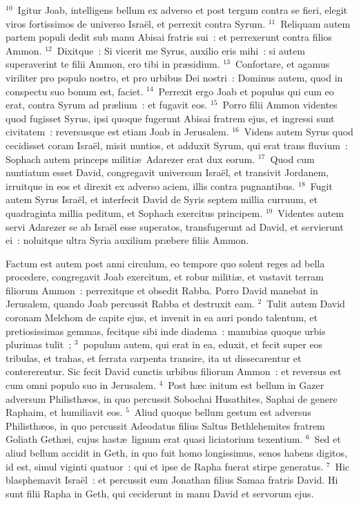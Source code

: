 ${}^{10}$~Igitur Joab, intelligens bellum ex adverso et post tergum contra se fieri, elegit viros fortissimos de universo Isra\"el, et perrexit contra Syrum.
${}^{11}$~Reliquam autem partem populi dedit sub manu Abisai fratris sui~: et perrexerunt contra filios Ammon.
${}^{12}$~Dixitque~: Si vicerit me Syrus, auxilio eris mihi~: si autem superaverint te filii Ammon, ero tibi in pr\ae sidium.
${}^{13}$~Confortare, et agamus viriliter pro populo nostro, et pro urbibus Dei nostri~: Dominus autem, quod in conspectu suo bonum est, faciet.
${}^{14}$~Perrexit ergo Joab et populus qui cum eo erat, contra Syrum ad pr\ae lium~: et fugavit eos.
${}^{15}$~Porro filii Ammon videntes quod fugisset Syrus, ipsi quoque fugerunt Abisai fratrem ejus, et ingressi sunt civitatem~: reversusque est etiam Joab in Jerusalem.
${}^{16}$~Videns autem Syrus quod cecidisset coram Isra\"el, misit nuntios, et adduxit Syrum, qui erat trans fluvium~: Sophach autem princeps militi\ae\ Adarezer erat dux eorum.
${}^{17}$~Quod cum nuntiatum esset David, congregavit universum Isra\"el, et transivit Jordanem, irruitque in eos et direxit ex adverso aciem, illis contra pugnantibus.
${}^{18}$~Fugit autem Syrus Isra\"el, et interfecit David de Syris septem millia curruum, et quadraginta millia peditum, et Sophach exercitus principem.
${}^{19}$~Videntes autem servi Adarezer se ab Isra\"el esse superatos, transfugerunt ad David, et servierunt ei~: noluitque ultra Syria auxilium pr\ae bere filiis Ammon.

\bchapter
\lettrine[lines=3,image=true,loversize=0.05,lraise=-0.03]{F}{}actum est autem post anni circulum, eo tempore quo solent reges ad bella procedere, congregavit Joab exercitum, et robur militi\ae , et vastavit terram filiorum Ammon~: perrexitque et obsedit Rabba. Porro David manebat in Jerusalem, quando Joab percussit Rabba et destruxit eam.
${}^{2}$~Tulit autem David coronam Melchom de capite ejus, et invenit in ea auri pondo talentum, et pretiosissimas gemmas, fecitque sibi inde diadema~: manubias quoque urbis plurimas tulit~;
${}^{3}$~populum autem, qui erat in ea, eduxit, et fecit super eos tribulas, et trahas, et ferrata carpenta transire, ita ut dissecarentur et contererentur. Sic fecit David cunctis urbibus filiorum Ammon~: et reversus est cum omni populo suo in Jerusalem.
${}^{4}$~Post h\ae c initum est bellum in Gazer adversum Philisth\ae os, in quo percussit Sobochai Husathites, Saphai de genere Raphaim, et humiliavit eos.
${}^{5}$~Aliud quoque bellum gestum est adversus Philisth\ae os, in quo percussit Adeodatus filius Saltus Bethlehemites fratrem Goliath Geth\ae i, cujus hast\ae\ lignum erat quasi liciatorium texentium.
${}^{6}$~Sed et aliud bellum accidit in Geth, in quo fuit homo longissimus, senos habens digitos, id est, simul viginti quatuor~: qui et ipse de Rapha fuerat stirpe generatus.
${}^{7}$~Hic blasphemavit Isra\"el~: et percussit eum Jonathan filius Samaa fratris David. Hi sunt filii Rapha in Geth, qui ceciderunt in manu David et servorum ejus.


